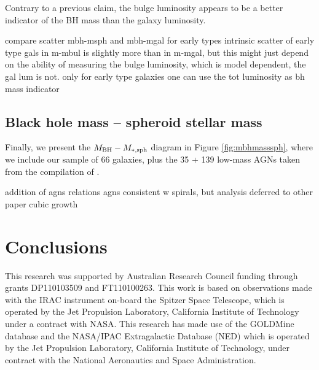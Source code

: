 \documentclass[preprint2]{emulateapj}
\begin{document}
Contrary to a previous claim, the bulge luminosity appears to be a better indicator of the BH mass than the galaxy luminosity.

compare scatter mbh-msph and mbh-mgal for early types
intrinsic scatter of early type gals in m-mbul is slightly more than in m-mgal, but this might just depend 
on the ability of measuring the bulge luminosity, which is model dependent, the gal lum is not.
only for early type galaxies one can use the tot luminosity as bh mass indicator

\subsection{Black hole mass -- spheroid stellar mass}
Finally, we present the $M_{\rm BH} - M_{\rm *,sph}$ diagram in Figure \ref{fig:mbhmasssph}, 
where we include our sample of 66 galaxies, 
plus the 35 + 139 low-mass AGNs taken from the compilation of \cite{grahamscott2015}. 

addition of agns
relations
agns consistent w spirals, but analysis deferred to other paper
cubic growth


\section{Conclusions}
\label{sec:concl}



\acknowledgments
This research was supported by Australian Research Council funding through grants
DP110103509 and FT110100263.
This work is based on observations made with the IRAC instrument \citep{fazio2004IRAC} 
on-board the Spitzer Space Telescope, 
which is operated by the Jet Propulsion Laboratory, 
California Institute of Technology under a contract with NASA.
This research has made use of the GOLDMine database \citep{goldmine} and the NASA/IPAC Extragalactic Database (NED) 
which is operated by the Jet Propulsion Laboratory, California Institute of Technology, 
under contract with the National Aeronautics and Space Administration. 





\clearpage
\end{document}
